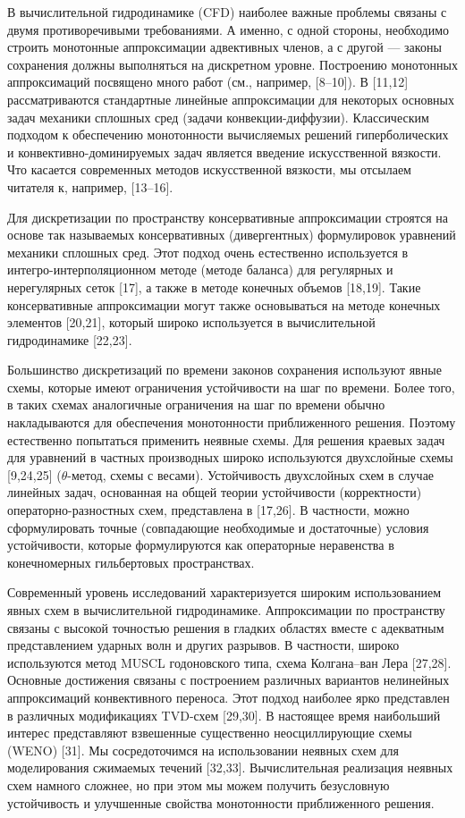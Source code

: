 \documentclass[10pt,twocolumn]{article}
\begin{document}
В вычислительной гидродинамике (CFD) наиболее важные проблемы связаны с двумя противоречивыми требованиями. А именно, с одной стороны, необходимо строить монотонные аппроксимации адвективных членов, а с другой — законы сохранения должны выполняться на дискретном уровне. Построению монотонных аппроксимаций посвящено много работ (см., например, [8–10]). В [11,12] рассматриваются стандартные линейные аппроксимации для некоторых основных задач механики сплошных сред (задачи конвекции-диффузии). Классическим подходом к обеспечению монотонности вычисляемых решений гиперболических и конвективно-доминируемых задач является введение искусственной вязкости. Что касается современных методов искусственной вязкости, мы отсылаем читателя к, например, [13–16].

Для дискретизации по пространству консервативные аппроксимации строятся на основе так называемых консервативных (дивергентных) формулировок уравнений механики сплошных сред. Этот подход очень естественно используется в интегро-интерполяционном методе (методе баланса) для регулярных и нерегулярных сеток [17], а также в методе конечных объемов [18,19]. Такие консервативные аппроксимации могут также основываться на методе конечных элементов [20,21], который широко используется в вычислительной гидродинамике [22,23].

Большинство дискретизаций по времени законов сохранения используют явные схемы, которые имеют ограничения устойчивости на шаг по времени. Более того, в таких схемах аналогичные ограничения на шаг по времени обычно накладываются для обеспечения монотонности приближенного решения. Поэтому естественно попытаться применить неявные схемы. Для решения краевых задач для уравнений в частных производных широко используются двухслойные схемы [9,24,25] (\(\theta\)-метод, схемы с весами). Устойчивость двухслойных схем в случае линейных задач, основанная на общей теории устойчивости (корректности) операторно-разностных схем, представлена в [17,26]. В частности, можно сформулировать точные (совпадающие необходимые и достаточные) условия устойчивости, которые формулируются как операторные неравенства в конечномерных гильбертовых пространствах.

Современный уровень исследований характеризуется широким использованием явных схем в вычислительной гидродинамике. Аппроксимации по пространству связаны с высокой точностью решения в гладких областях вместе с адекватным представлением ударных волн и других разрывов. В частности, широко используются метод MUSCL годоновского типа, схема Колгана–ван Лера [27,28]. Основные достижения связаны с построением различных вариантов нелинейных аппроксимаций конвективного переноса. Этот подход наиболее ярко представлен в различных модификациях TVD-схем [29,30]. В настоящее время наибольший интерес представляют взвешенные существенно неосциллирующие схемы (WENO) [31]. Мы сосредоточимся на использовании неявных схем для моделирования сжимаемых течений [32,33]. Вычислительная реализация неявных схем намного сложнее, но при этом мы можем получить безусловную устойчивость и улучшенные свойства монотонности приближенного решения.
\end{document}

